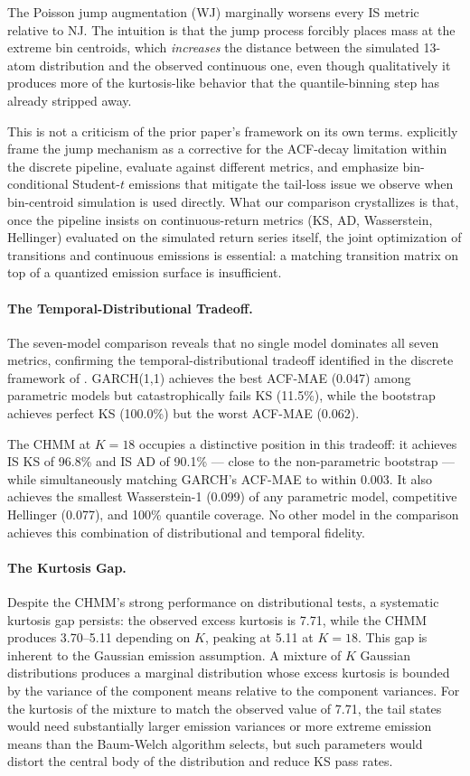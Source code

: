 The Poisson jump augmentation (WJ) marginally worsens every IS metric relative to NJ.
The intuition is that the jump process forcibly places mass at the extreme bin centroids, which \emph{increases} the distance between the simulated 13-atom distribution and the observed continuous one, even though qualitatively it produces more of the kurtosis-like behavior that the quantile-binning step has already stripped away.

This is not a criticism of the prior paper's framework on its own terms.
\citet{alswaidan2026hybrid} explicitly frame the jump mechanism as a corrective for the ACF-decay limitation within the discrete pipeline, evaluate against different metrics, and emphasize bin-conditional Student-$t$ emissions that mitigate the tail-loss issue we observe when bin-centroid simulation is used directly.
What our comparison crystallizes is that, once the pipeline insists on continuous-return metrics (KS, AD, Wasserstein, Hellinger) evaluated on the simulated return series itself, the joint optimization of transitions and continuous emissions is essential: a matching transition matrix on top of a quantized emission surface is insufficient.

\paragraph{The Temporal-Distributional Tradeoff.}
The seven-model comparison reveals that no single model dominates all seven metrics, confirming the temporal-distributional tradeoff identified in the discrete framework of \citet{alswaidan2026hybrid}.
GARCH(1,1) achieves the best ACF-MAE (0.047) among parametric models but catastrophically fails KS (11.5\%), while the bootstrap achieves perfect KS (100.0\%) but the worst ACF-MAE (0.062).

The CHMM at $K = 18$ occupies a distinctive position in this tradeoff: it achieves IS KS of 96.8\% and IS AD of 90.1\% --- close to the non-parametric bootstrap --- while simultaneously matching GARCH's ACF-MAE to within 0.003.
It also achieves the smallest Wasserstein-1 (0.099) of any parametric model, competitive Hellinger (0.077), and 100\% quantile coverage.
No other model in the comparison achieves this combination of distributional and temporal fidelity.

\paragraph{The Kurtosis Gap.}
Despite the CHMM's strong performance on distributional tests, a systematic kurtosis gap persists: the observed excess kurtosis is 7.71, while the CHMM produces 3.70--5.11 depending on $K$, peaking at 5.11 at $K = 18$.
This gap is inherent to the Gaussian emission assumption.
A mixture of $K$ Gaussian distributions produces a marginal distribution whose excess kurtosis is bounded by the variance of the component means relative to the component variances.
For the kurtosis of the mixture to match the observed value of 7.71, the tail states would need substantially larger emission variances or more extreme emission means than the Baum-Welch algorithm selects, but such parameters would distort the central body of the distribution and reduce KS pass rates.

